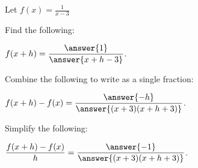 \documentclass{ximera}
\author{Bobby Ramsey}
\begin{document}
\begin{exercise}
	Let $\displaystyle f(x) = \frac{1}{x-3}$			
	
		Find the following:
		
		$\displaystyle f(x+h) = \frac{\answer{1}}{\answer{x+h-3}}$.
		
		\begin{exercise}
		
			Combine the following to write as a single fraction:
			
			$\displaystyle f(x+h)-f(x) = \frac{\answer{-h}}{\answer{(x+3)(x+h+3)}}$.
			\begin{exercise}
				Simplify the following:
				
				$\displaystyle \frac{f(x+h)-f(x)}{h} = \frac{\answer{-1}}{\answer{(x+3)(x+h+3)}}$.
			\end{exercise}
	\end{exercise}
\end{exercise}
	
\end{document}
